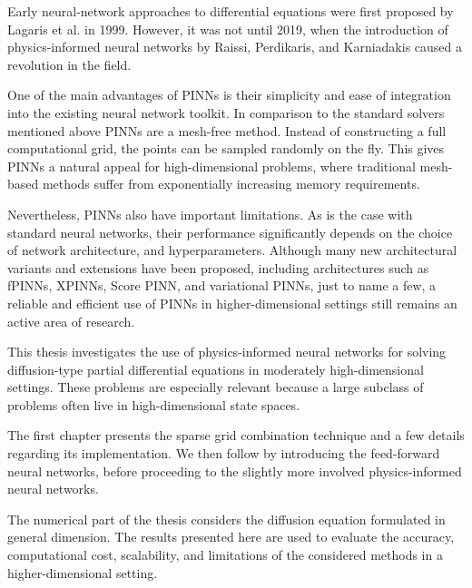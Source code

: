 Early neural-network approaches to differential
equations were first proposed by Lagaris et al. \cite{lagaris} in 1999.
However, it was not until 2019, when
the introduction of physics-informed neural networks
by Raissi, Perdikaris, and Karniadakis \cite{pinns_original}
caused a revolution in the field.

One of the main advantages of PINNs is their simplicity and ease of 
integration into the existing neural network toolkit.
In comparison to the standard solvers mentioned above
PINNs are a mesh-free method.
Instead of constructing a full computational grid,
the points can be sampled randomly on the fly.
This gives PINNs a natural appeal for high-dimensional
problems, where traditional mesh-based methods suffer from exponentially
increasing memory requirements.

Nevertheless, PINNs also have important limitations.
As is the case with standard neural networks,
their performance %
significantly depends on the choice of network architecture,
and hyperparameters.
Although many new architectural variants and extensions have been proposed,
including architectures such as fPINNs, XPINNs, Score PINN, and variational PINNs, 
just to name a few,
a reliable and efficient use of PINNs in higher-dimensional
settings still remains an active area of research.\cite{comprehensive_analysis}

%
%

This thesis investigates the use of physics-informed neural networks for solving
diffusion-type partial differential equations in moderately high-dimensional settings.
These problems are especially relevant
because a large subclass of problems often live in high-dimensional state spaces.

The first chapter presents the
sparse grid combination technique and a few details regarding its implementation.
We then follow by introducing the feed-forward neural networks, before proceeding
to the slightly more involved physics-informed neural networks.

The numerical part of the thesis considers the
diffusion equation formulated in general dimension.
The results presented here are used to evaluate the
accuracy, computational cost, scalability,
and limitations of the considered methods
in a higher-dimensional setting.



